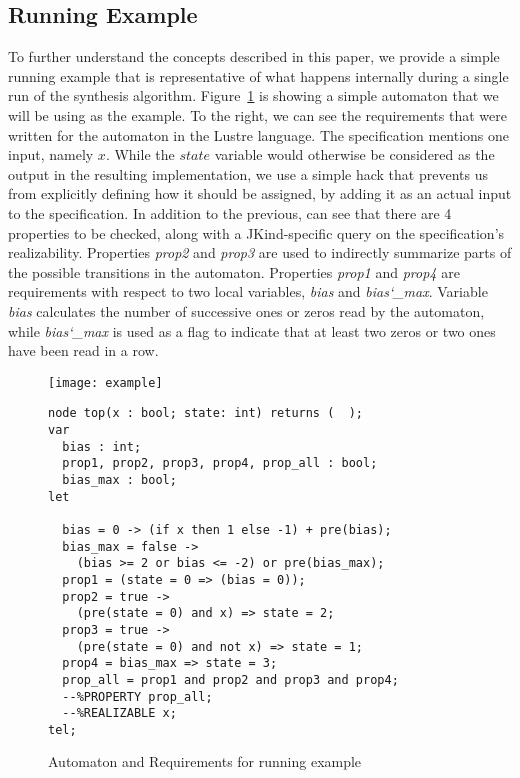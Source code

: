  
 \subsection{Running Example}
 
 To further understand the concepts described in this paper, we provide a simple
 running example that is representative of what happens internally during a
 single run of the synthesis algorithm. Figure~\ref{fg:example} is showing a
 simple automaton that we will be using as the example. To the right, we can see
 the requirements that were written for the automaton in the Lustre language.
 The specification mentions one input, namely $x$. While the $state$ variable
 would otherwise be considered as the output in the resulting implementation,
 we use a simple hack that prevents us from explicitly defining how it should
 be assigned, by adding it as an actual input to the specification. In addition
 to the previous, can see that there are 4 properties to be checked, along with a
 JKind-specific query on the specification's realizability. Properties
 \textit{prop2} and \textit{prop3} are used to indirectly summarize parts of the
 possible transitions in the automaton. Properties \textit{prop1} and
 \textit{prop4} are requirements with respect to two local variables, \textit{bias}
 and \textit{bias\char`_max}. Variable \textit{bias} calculates the number of successive
 ones or zeros read by the automaton, while \textit{bias\char`_max} is used as a flag
 to indicate that at least two zeros or two ones have been read in a row.
 
\begin{figure}[H]
\begin{minipage}[c]{0.35\textwidth}
\centering
\texttt{[image: example]}
\end{minipage}
\begin{minipage}[c]{0.7\textwidth}
 \begin{Verbatim}[fontsize=\scriptsize]
node top(x : bool; state: int) returns (  );
var
  bias : int;
  prop1, prop2, prop3, prop4, prop_all : bool;
  bias_max : bool;
let

  bias = 0 -> (if x then 1 else -1) + pre(bias);
  bias_max = false ->
	(bias >= 2 or bias <= -2) or pre(bias_max);
  prop1 = (state = 0 => (bias = 0));
  prop2 = true ->
  	(pre(state = 0) and x) => state = 2;
  prop3 = true ->
  	(pre(state = 0) and not x) => state = 1;
  prop4 = bias_max => state = 3;
  prop_all = prop1 and prop2 and prop3 and prop4;
  --%PROPERTY prop_all;
  --%REALIZABLE x;
tel;
 \end{Verbatim}
\end{minipage}
\caption{Automaton and Requirements for running example}
\label{fg:example}
\end{figure}

